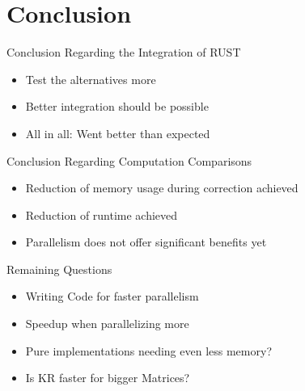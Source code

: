 \section{Conclusion}


\begin{frame}[c]{Conclusion Regarding the Integration of RUST}
    \begin{itemize}[<+(1)->]
        \item Test the alternatives more
        \item Better integration should be possible
        \item All in all: Went better than expected
    \end{itemize}
\end{frame}


\begin{frame}[c]{Conclusion Regarding Computation Comparisons}
    \begin{itemize}[<+(1)->]
        \item Reduction of memory usage during correction achieved
        \item Reduction of runtime achieved
        \item Parallelism does not offer significant benefits yet
    \end{itemize}
\end{frame}


\begin{frame}[c]{Remaining Questions}
    \begin{itemize}[<+(1)->]
        \item Writing Code for faster parallelism
        \item Speedup when parallelizing more
        \item Pure implementations needing even less memory?
        \item Is KR faster for bigger Matrices?
    \end{itemize}
\end{frame}



